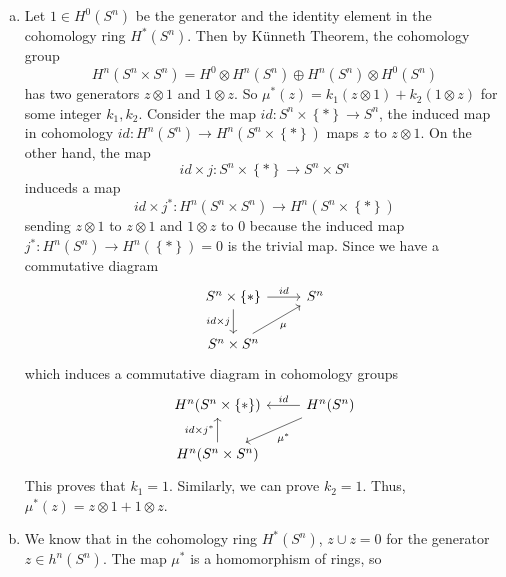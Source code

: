 \documentclass[letterpaper, 12pt]{article}
\begin{document}
\begin{solution}
\begin{enumerate}[(a)]
\item Let \(1\in H^0(S^n)\) be the generator and the identity element in the cohomology ring \(H^*(S^n)\). Then by Künneth Theorem, the cohomology group 
\[H^n(S^n\times S^n)=H^0\otimes H^n(S^n)\oplus H^n(S^n)\otimes H^0(S^n)\]
has two generators \(z\otimes 1\) and \(1\otimes z\). So \(\mu^*(z)=k_1(z\otimes 1)+k_2(1\otimes z)\) for some integer \(k_1,k_2\). Consider the map \(id:S^n\times \left\{ * \right\}\rightarrow S^n\), the induced map in cohomology \(id:H^n(S^n)\rightarrow H^n(S^n\times \left\{ * \right\})\) maps \(z\) to \(z\otimes 1\). On the other hand, the map 
\[id\times j:S^n\times \left\{ * \right\}\rightarrow S^n\times S^n\]
induceds a map 
\[id\times j^*:H^n(S^n\times S^n)\rightarrow H^n(S^n\times \left\{ * \right\})\]
sending \(z\otimes 1\) to \(z\otimes 1\) and \(1\otimes z\) to \(0\) because the induced map \(j^*:H^n(S^n)\rightarrow H^n(\left\{ * \right\})=0\) is the trivial map. Since we have a commutative diagram 
\[\begin{tikzcd}
	{S^n\times \left\{*\right\}} & {S^n} \\
	{S^n\times S^n}
	\arrow["id", from=1-1, to=1-2]
	\arrow["{id\times j}"', from=1-1, to=2-1]
	\arrow["\mu"', from=2-1, to=1-2]
\end{tikzcd}\]
which induces a commutative diagram in cohomology groups 
\[\begin{tikzcd}
	{H^n(S^n\times \left\{*\right\})} & {H^n(S^n)} \\
	{H^n(S^n\times S^n)}
	\arrow["id"', from=1-2, to=1-1]
	\arrow["{\mu^*}", from=1-2, to=2-1]
	\arrow["{id\times j^*}", from=2-1, to=1-1]
\end{tikzcd}\]
This proves that \(k_1=1\). Similarly, we can prove \(k_2=1\). Thus, \(\mu^*(z)=z\otimes 1+1\otimes z\). 
\item We know that in the cohomology ring \(H^*(S^n)\), \(z\cup z=0\) for the generator \(z\in h^n(S^n)\). The map \(\mu^*\) is a homomorphism of rings, so 
\begin{align*}

\end{align*}
\end{enumerate}
\end{solution}
\end{document}
